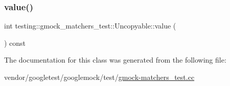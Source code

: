 \mbox{\label{classtesting_1_1gmock__matchers__test_1_1_uncopyable_a23512131b948e40ded06555848829866}} 
\subsubsection{\texorpdfstring{value()}{value()}}
{\footnotesize\ttfamily int testing\+::gmock\+\_\+matchers\+\_\+test\+::\+Uncopyable\+::value (\begin{DoxyParamCaption}{ }\end{DoxyParamCaption}) const\hspace{0.3cm}{\ttfamily [inline]}}



The documentation for this class was generated from the following file\+:\begin{DoxyCompactItemize}
\item 
vendor/googletest/googlemock/test/\hyperlink{gmock-matchers__test_8cc}{gmock-\/matchers\+\_\+test.\+cc}\end{DoxyCompactItemize}

